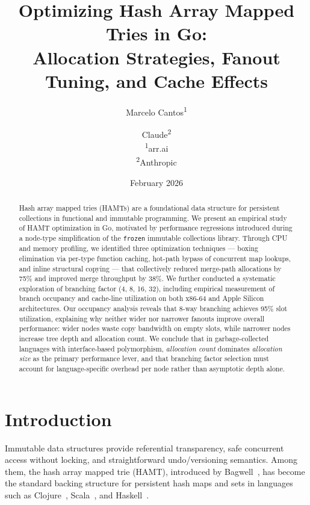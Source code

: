 \documentclass[11pt,twocolumn]{article}
\title{Optimizing Hash Array Mapped Tries in Go:\\
Allocation Strategies, Fanout Tuning, and Cache Effects}
\author{%
  Marcelo Cantos\textsuperscript{1} \and
  Claude\textsuperscript{2} \\[6pt]
  \textsuperscript{1}arr.ai \\
  \textsuperscript{2}Anthropic
}
\date{February 2026}
\begin{document}
\maketitle

\begin{abstract}
Hash array mapped tries (HAMTs) are a foundational data structure for
persistent collections in functional and immutable programming.
We present an empirical study of HAMT optimization in Go, motivated by
performance regressions introduced during a node-type simplification of the
\texttt{frozen} immutable collections library.
Through CPU and memory profiling, we identified three optimization techniques
--- boxing elimination via per-type function caching, hot-path bypass of
concurrent map lookups, and inline structural copying --- that collectively
reduced merge-path allocations by 75\% and improved merge throughput by 38\%.
We further conducted a systematic exploration of branching factor (4, 8, 16, 32),
including empirical measurement of branch occupancy and cache-line utilization
on both x86-64 and Apple Silicon architectures.
Our occupancy analysis reveals that 8-way branching achieves 95\% slot
utilization, explaining why neither wider nor narrower fanouts improve overall
performance: wider nodes waste copy bandwidth on empty slots, while narrower
nodes increase tree depth and allocation count.
We conclude that in garbage-collected languages with interface-based
polymorphism, \emph{allocation count} dominates \emph{allocation size} as the
primary performance lever, and that branching factor selection must account for
language-specific overhead per node rather than asymptotic depth alone.
\end{abstract}

\section{Introduction}
\label{sec:introduction}

Immutable data structures provide referential transparency, safe concurrent
access without locking, and straightforward undo/versioning semantics.
Among them, the hash array mapped trie (HAMT), introduced by
Bagwell~\cite{bagwell2001}, has become the standard backing structure for
persistent hash maps and sets in languages such as
Clojure~\cite{hickey2008}, Scala~\cite{odersky2004}, and
Haskell~\cite{tibell2014}.
\end{document}
